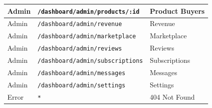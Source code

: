 \documentclass[a4paper,11pt]{article}
\begin{document}
{\begin{center}
\begin{tabular}{|l|l|l|}
Admin & \texttt{/dashboard/admin/products/:id} & Product Buyers \\ \hline
Admin & \texttt{/dashboard/admin/revenue} & Revenue \\ \hline
Admin & \texttt{/dashboard/admin/marketplace} & Marketplace \\ \hline
Admin & \texttt{/dashboard/admin/reviews} & Reviews \\ \hline
Admin & \texttt{/dashboard/admin/subscriptions} & Subscriptions \\ \hline
Admin & \texttt{/dashboard/admin/messages} & Messages \\ \hline
Admin & \texttt{/dashboard/admin/settings} & Settings \\ \hline\hline
Error & \texttt{*} & 404 Not Found \\ \hline
\end{tabular}
\end{center}
}
\end{document}
